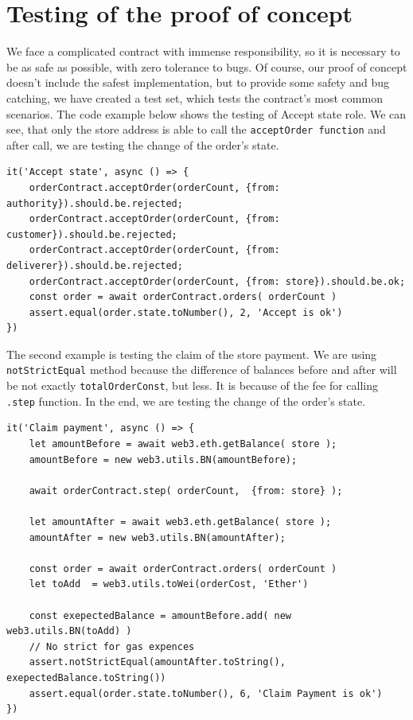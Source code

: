 \documentclass[thesis=M,english]{FITthesis}[2019/12/23]
\begin{document}
\section{Testing of the proof of concept}

We face a complicated contract with immense responsibility, so it is necessary to be as safe as possible, with zero tolerance to bugs. Of course, our proof of concept doesn't include the safest implementation, but to provide some safety and bug catching, we have created a test set, which tests the contract's most common scenarios. The code example below shows the testing of Accept state role. We can see, that only the store address is able to call the \texttt{acceptOrder function} and after call, we are testing the change of the order's state.

\begin{minipage}{\linewidth}
\begin{lstlisting}[caption=OrderLogicContract.js test case of Accept state]
it('Accept state', async () => {
    orderContract.acceptOrder(orderCount, {from: authority}).should.be.rejected;
    orderContract.acceptOrder(orderCount, {from: customer}).should.be.rejected;
    orderContract.acceptOrder(orderCount, {from: deliverer}).should.be.rejected;
    orderContract.acceptOrder(orderCount, {from: store}).should.be.ok;
    const order = await orderContract.orders( orderCount )
    assert.equal(order.state.toNumber(), 2, 'Accept is ok')
})
\end{lstlisting}
\end{minipage}

The second example is testing the claim of the store payment. We are using \texttt{notStrictEqual} method because the difference of balances before and after will be not exactly \texttt{totalOrderConst}, but less. It is because of the fee for calling \texttt{.step} function. In the end, we are testing the change of the order's state.


\begin{lstlisting}[caption==OrderLogicContract.js test case of Claim payment]
it('Claim payment', async () => {
    let amountBefore = await web3.eth.getBalance( store );
    amountBefore = new web3.utils.BN(amountBefore);

    await orderContract.step( orderCount,  {from: store} );

    let amountAfter = await web3.eth.getBalance( store );
    amountAfter = new web3.utils.BN(amountAfter);

    const order = await orderContract.orders( orderCount )
    let toAdd  = web3.utils.toWei(orderCost, 'Ether')

    const exepectedBalance = amountBefore.add( new web3.utils.BN(toAdd) )
    // No strict for gas expences
    assert.notStrictEqual(amountAfter.toString(), exepectedBalance.toString())
    assert.equal(order.state.toNumber(), 6, 'Claim Payment is ok')
})
\end{lstlisting}
\end{document}
